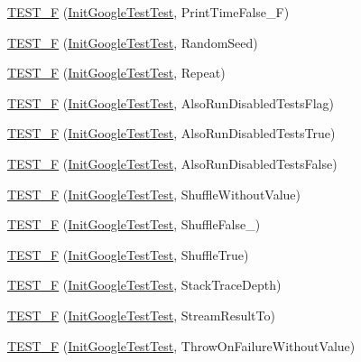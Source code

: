 \begin{DoxyCompactItemize}
\item 
\hyperlink{namespacetesting_a337ddb6629adb42219e612b67d18c6f1}{T\+E\+S\+T\+\_\+F} (\hyperlink{classtesting_1_1_init_google_test_test}{Init\+Google\+Test\+Test}, Print\+Time\+False\+\_\+F)
\item 
\hyperlink{namespacetesting_a2a1e31fea507bdd6e011450e2f316bcf}{T\+E\+S\+T\+\_\+F} (\hyperlink{classtesting_1_1_init_google_test_test}{Init\+Google\+Test\+Test}, Random\+Seed)
\item 
\hyperlink{namespacetesting_a254368f412c980556143a9182f451981}{T\+E\+S\+T\+\_\+F} (\hyperlink{classtesting_1_1_init_google_test_test}{Init\+Google\+Test\+Test}, Repeat)
\item 
\hyperlink{namespacetesting_ab6624d856abda0913f536a4e719dd769}{T\+E\+S\+T\+\_\+F} (\hyperlink{classtesting_1_1_init_google_test_test}{Init\+Google\+Test\+Test}, Also\+Run\+Disabled\+Tests\+Flag)
\item 
\hyperlink{namespacetesting_a3e73dbd19fb50e5ad516de9592963033}{T\+E\+S\+T\+\_\+F} (\hyperlink{classtesting_1_1_init_google_test_test}{Init\+Google\+Test\+Test}, Also\+Run\+Disabled\+Tests\+True)
\item 
\hyperlink{namespacetesting_a1c50ef2a972315130f1613c69204e259}{T\+E\+S\+T\+\_\+F} (\hyperlink{classtesting_1_1_init_google_test_test}{Init\+Google\+Test\+Test}, Also\+Run\+Disabled\+Tests\+False)
\item 
\hyperlink{namespacetesting_a2f1fd86207e6c7085455dc2d582d1d12}{T\+E\+S\+T\+\_\+F} (\hyperlink{classtesting_1_1_init_google_test_test}{Init\+Google\+Test\+Test}, Shuffle\+Without\+Value)
\item 
\hyperlink{namespacetesting_a1acc3dcde65e75293451073528cb1c5a}{T\+E\+S\+T\+\_\+F} (\hyperlink{classtesting_1_1_init_google_test_test}{Init\+Google\+Test\+Test}, Shuffle\+False\+\_)
\item 
\hyperlink{namespacetesting_a24bb2b3783b9e0c419db7f974b641cd4}{T\+E\+S\+T\+\_\+F} (\hyperlink{classtesting_1_1_init_google_test_test}{Init\+Google\+Test\+Test}, Shuffle\+True)
\item 
\hyperlink{namespacetesting_af8579f8ad3383827814d1fbea4fdeee9}{T\+E\+S\+T\+\_\+F} (\hyperlink{classtesting_1_1_init_google_test_test}{Init\+Google\+Test\+Test}, Stack\+Trace\+Depth)
\item 
\hyperlink{namespacetesting_ad9cf0c452b4d2645b037725957021c6c}{T\+E\+S\+T\+\_\+F} (\hyperlink{classtesting_1_1_init_google_test_test}{Init\+Google\+Test\+Test}, Stream\+Result\+To)
\item 
\hyperlink{namespacetesting_a2824800277b4a1e8732abd5d7c2349d1}{T\+E\+S\+T\+\_\+F} (\hyperlink{classtesting_1_1_init_google_test_test}{Init\+Google\+Test\+Test}, Throw\+On\+Failure\+Without\+Value)

\end{DoxyCompactItemize}
